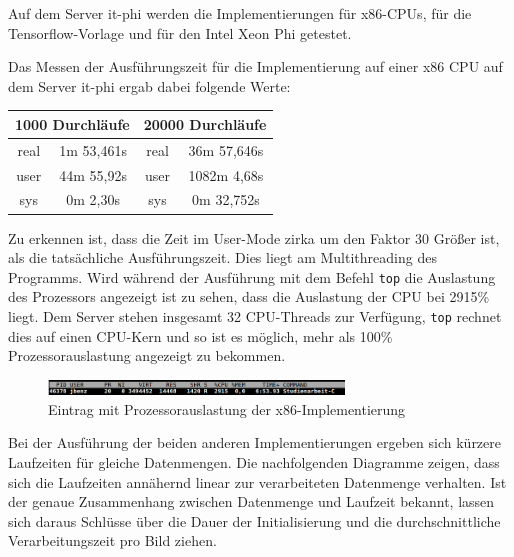 \documentclass[../main.tex]{subfiles}
\begin{document}
Auf dem Server it-phi werden die Implementierungen für x86-CPUs, für die Tensorflow-Vorlage und für den Intel Xeon Phi getestet. 

Das Messen der Ausführungszeit für die Implementierung auf einer x86 CPU auf dem Server it-phi ergab dabei folgende Werte:\par

\begin{tabular}{|c|c||c|c|}
	\hline
	\multicolumn{2}{|c||}{1000 Durchläufe} & \multicolumn{2}{c|}{20000 Durchläufe} \\ \hline
	real & 1m 53,461s & real & 36m 57,646s\\ 
	\hline
	user & 44m 55,92s & user & 1082m 4,68s \\ 
	\hline
	sys & 0m 2,30s & sys & 0m 32,752s\\ 
	\hline
\end{tabular}

Zu erkennen ist, dass die Zeit im User-Mode zirka um den Faktor 30 Größer ist, als die tatsächliche Ausführungszeit.
Dies liegt am Multithreading des Programms. Wird während der Ausführung mit dem Befehl \texttt{top} die Auslastung des Prozessors angezeigt ist zu sehen, dass die Auslastung der CPU bei 2915\% liegt. Dem Server stehen insgesamt 32 CPU-Threads zur Verfügung, \texttt{top} rechnet dies auf einen CPU-Kern und so ist es möglich, mehr als 100\% Prozessorauslastung angezeigt zu bekommen.
\begin{figure}[!htbp]
	\centering
	\includegraphics[width=0.7\textwidth]{../images/Benz/screenshot_top.png} %
	\caption{Eintrag mit Prozessorauslastung der x86-Implementierung} 
\end{figure}

Bei der Ausführung der beiden anderen Implementierungen ergeben sich kürzere Laufzeiten für gleiche Datenmengen. Die nachfolgenden Diagramme zeigen, dass sich die Laufzeiten annähernd linear zur verarbeiteten Datenmenge verhalten. Ist der genaue Zusammenhang zwischen Datenmenge und Laufzeit bekannt, lassen sich daraus Schlüsse über die Dauer der Initialisierung und die durchschnittliche Verarbeitungszeit pro Bild ziehen. 
\end{document}
